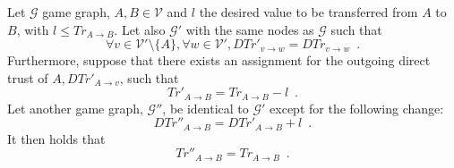 {}
\begin{theorem}
\label{riskinv}
  Let $\mathcal{G}$ game graph, $A, B \in \mathcal{V}$ and $l$ the desired value to be transferred from $A$ to $B$,
  with $l \leq Tr_{A \rightarrow B}$. Let also $\mathcal{G}'$ with the same nodes as $\mathcal{G}$ such that
  \begin{equation*}
    \forall v \in \mathcal{V}' \setminus \{A\}, \forall w \in \mathcal{V}', DTr'_{v \rightarrow w} =
    DTr_{v \rightarrow w} \enspace.
  \end{equation*}
  Furthermore, suppose that there exists an assignment for the outgoing direct trust of $A, DTr'_{A \rightarrow v}$, such
  that
  \begin{equation}
  \label{primetrust}
    Tr'_{A \rightarrow B} = Tr_{A \rightarrow B} - l \enspace.
  \end{equation}
  Let another game graph, $\mathcal{G}''$, be identical to $\mathcal{G}'$ except for the following change:
  \begin{equation*}
    DTr''_{A \rightarrow B} = DTr'_{A \rightarrow B} + l \enspace.
  \end{equation*}
  It then holds that
  \begin{equation*}
    Tr''_{A \rightarrow B} = Tr_{A \rightarrow B} \enspace.
  \end{equation*}
\end{theorem}
